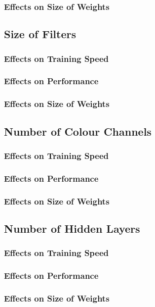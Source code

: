 \subsubsection{Effects on Size of Weights}

\subsection{Size of Filters}
\subsubsection{Effects on Training Speed}
\subsubsection{Effects on Performance}
\subsubsection{Effects on Size of Weights}

\subsection{Number of Colour Channels}
\subsubsection{Effects on Training Speed}
\subsubsection{Effects on Performance}
\subsubsection{Effects on Size of Weights}

\subsection{Number of Hidden Layers}
\subsubsection{Effects on Training Speed}
\subsubsection{Effects on Performance}
\subsubsection{Effects on Size of Weights}

